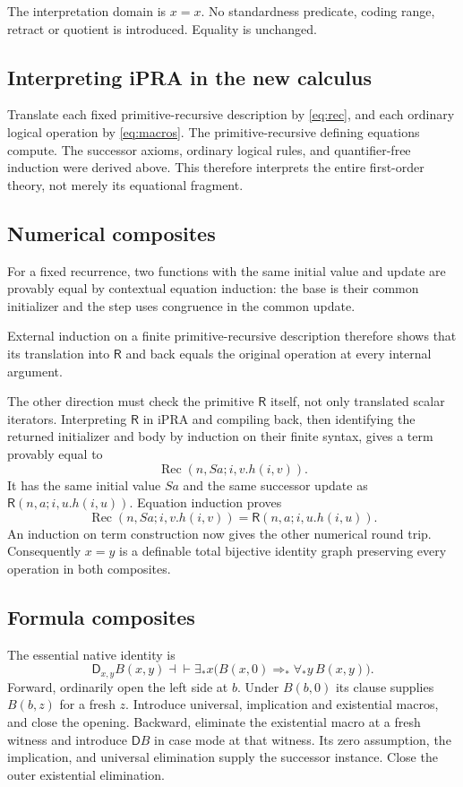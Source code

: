 \documentclass[11pt]{article}
\theoremstyle{definition}
\theoremstyle{remark}
\newcommand{\R}{\mathsf R}
\newcommand{\D}{\mathsf D}
\newcommand{\Rec}{\operatorname{Rec}}
\newcommand{\inter}{\dashv\vdash}
\begin{document}
The interpretation domain is $x=x$.
No standardness predicate, coding range,
retract or quotient is introduced.
Equality is unchanged.

\subsection{Interpreting iPRA in the new calculus}

Translate each fixed primitive-recursive
description by \eqref{eq:rec}, and each
ordinary logical operation by
\eqref{eq:macros}. The primitive-recursive
defining equations compute. The successor
axioms, ordinary logical rules, and
quantifier-free induction were derived
above. This therefore interprets the
entire first-order theory, not merely
its equational fragment.

\subsection{Numerical composites}

For a fixed recurrence, two functions with
the same initial value and update are
provably equal by contextual equation
induction: the base is their common
initializer and the step uses congruence
in the common update.

External induction on a finite
primitive-recursive description therefore
shows that its translation into $\R$
and back equals the original operation
at every internal argument.

The other direction must check the
primitive $\R$ itself, not only translated
scalar iterators. Interpreting $\R$ in
iPRA and compiling back, then identifying
the returned initializer and body by
induction on their finite syntax, gives
a term provably equal to
\[
 \Rec(n,Sa;i,v.h(i,v)).
\]
It has the same initial value $Sa$ and
the same successor update as
$\R(n,a;i,u.h(i,u))$.
Equation induction proves
\begin{equation}
 \Rec(n,Sa;i,v.h(i,v))
 =
 \R(n,a;i,u.h(i,u)).
 \label{eq:rround}
\end{equation}
An induction on term construction now
gives the other numerical round trip.
Consequently $x=y$ is a definable total
bijective identity graph preserving
every operation in both composites.

\subsection{Formula composites}

The essential native identity is
\begin{equation}
 \D_{x,y}B(x,y)
 \inter
 \exists_*x\bigl(B(x,0)\Rightarrow_*
                     \forall_*y\,B(x,y)\bigr).
 \label{eq:dround}
\end{equation}
Forward, ordinarily open the left side
at $b$. Under $B(b,0)$ its clause
supplies $B(b,z)$ for a fresh $z$.
Introduce universal, implication and
existential macros, and close the opening.
Backward, eliminate the existential
macro at a fresh witness and introduce
$\D B$ in case mode at that witness.
Its zero assumption, the implication,
and universal elimination supply the
successor instance. Close the outer
existential elimination.
\end{document}
